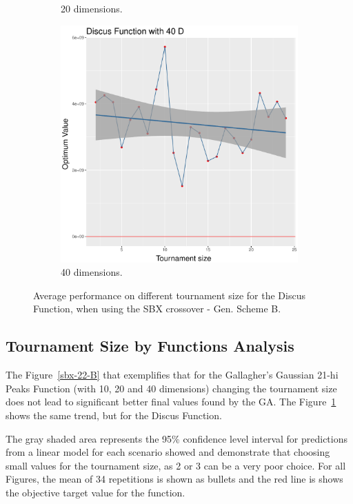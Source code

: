 \begin{figure}[t]
\begin{subfigure}[b]{0.33\textwidth}
		\caption{20 dimensions.}
	\end{subfigure}
	\begin{subfigure}[b]{0.33\textwidth}
		\centering
		\includegraphics[width=\textwidth]{img/unimodal_2n2n_11_dim_40.pdf}
		\caption{40 dimensions.}
	\end{subfigure}
	\caption{Average performance on different tournament size for the Discus Function, when using the SBX crossover - Gen. Scheme B.}
	\label{sbx-11-B}
\end{figure}


\subsection{Tournament Size by Functions Analysis}
The Figure~\ref{sbx-22-B} that exemplifies that for the Gallagher's Gaussian 21-hi Peaks Function (with 10, 20 and 40 dimensions) changing the tournament size does not lead to significant better final values found by the GA. The Figure~\ref{sbx-11-B} shows the same trend, but for the Discus Function.

The gray shaded area represents the 95\% confidence level interval for predictions from a linear model for each scenario showed and demonstrate that choosing small values for the tournament size, as 2 or 3 can be a very poor choice. For all Figures, the mean of 34 repetitions is shown as bullets and the red line is shows the objective target value for the function.


